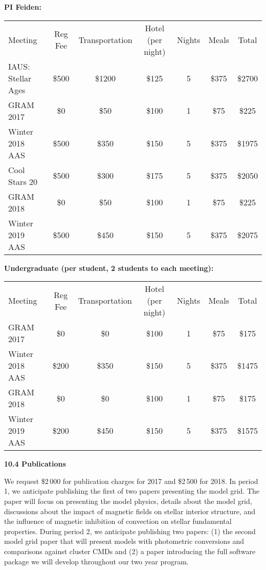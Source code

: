 {\bf PI Feiden:}

\begin{center}
\begin{tabular*}{\linewidth}{l c c c c c c}
	Meeting            &  Reg Fee & Transportation & Hotel (per night) & Nights & Meals & Total \\
	\noalign{\smallskip}\hline\hline\noalign{\smallskip}
	IAUS: Stellar Ages & \$500  & \$1200  & \$125 & 5 & \$375 & \$2700 \\
	GRAM 2017          & \$0    & \$50    & \$100 & 1 & \$75  & \$225  \\
	Winter 2018 AAS    & \$500  & \$350   & \$150 & 5 & \$375 & \$1975 \\
	Cool Stars 20      & \$500  & \$300   & \$175 & 5 & \$375 & \$2050 \\
	GRAM 2018          & \$0    & \$50    & \$100 & 1 & \$75  & \$225  \\
	Winter 2019 AAS    & \$500  & \$450   & \$150 & 5 & \$375 & \$2075 \\
\end{tabular*}
\end{center}

{\bf Undergraduate (per student, 2 students to each meeting):}

\begin{center}
\begin{tabular*}{\linewidth}{l c c c c c c}
	Meeting            &  Reg Fee & Transportation & Hotel (per night) & Nights & Meals & Total \\
	\noalign{\smallskip}\hline\hline\noalign{\smallskip}
	GRAM 2017          & \$0    & \$0     & \$100 & 1 & \$75  & \$175  \\
	Winter 2018 AAS    & \$200  & \$350   & \$150 & 5 & \$375 & \$1475 \\
	GRAM 2018          & \$0    & \$0     & \$100 & 1 & \$75  & \$175  \\
	Winter 2019 AAS    & \$200  & \$450   & \$150 & 5 & \$375 & \$1575 \\
\end{tabular*}
\end{center}


{\bf 10.4 Publications}

We request \$2\,000 for publication charges for 2017 and \$2\,500 for 2018. In period 1, we anticipate publishing the first of two papers presenting the model grid. The paper will focus on presenting the model physics, details about the model grid, discussions about the impact of magnetic fields on stellar interior structure, and the influence of magnetic inhibition of convection on stellar fundamental properties. During period 2, we anticipate publishing two papers: (1) the second model grid paper that will present models with photometric conversions and comparisons against cluster CMDs and (2) a paper introducing the full software package we will develop throughout our two year program.